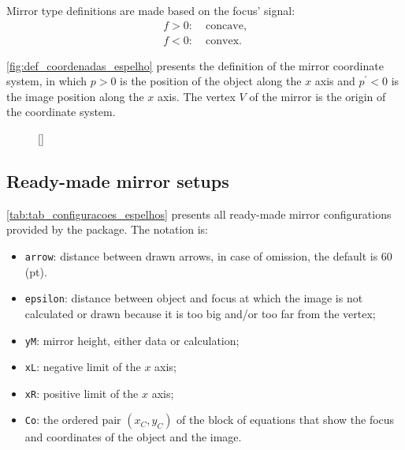 \documentclass[a4paper,10pt]{article}
\begin{document}
Mirror type definitions are made based on the focus' signal:
\begin{equation}
  \begin{split}
    f > 0: & \; \textrm{concave}, \\
    f < 0: & \; \textrm{convex}.
  \end{split}
\end{equation}

\autoref{fig:def_coordenadas_espelho} presents the definition of the mirror coordinate system, in which $p > 0$ is the position of the object along the $x$ axis and $p^{\prime} < 0$ is the image position along the $x$ axis. The vertex $V$ of the mirror is the origin of the coordinate system.

\begin{figure}[!ht]
  \centering
  [\linewidth]{
  }
\end{figure}

\subsection{Ready-made mirror setups}

\autoref{tab:tab_configuracoes_espelhos} presents all ready-made mirror configurations provided by the package. The notation is:
\begin{itemize}
  \item \texttt{arrow}: distance between drawn arrows, in case of omission, the default is 60 (pt).
  \item \texttt{epsilon}: distance between object and focus at which the image is not calculated or drawn because it is too big and/or too far from the vertex;
  \item \texttt{yM}: mirror height, either data or calculation;
  \item \texttt{xL}: negative limit of the $x$ axis;
  \item \texttt{xR}: positive limit of the $x$ axis;
  \item \texttt{Co}: the ordered pair $(x_C,y_C)$ of the block of equations that show the focus and coordinates of the object and the image.
\end{itemize}
\end{document}
